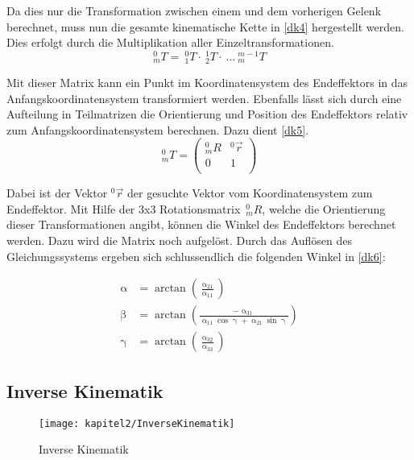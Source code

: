 Da dies nur die Transformation zwischen einem und dem vorherigen Gelenk berechnet, muss nun die gesamte kinematische Kette in \autoref{dk4} hergestellt werden. Dies erfolgt durch die Multiplikation aller Einzeltransformationen.
\begin{equation}
  ^{0}_{m}T =\: ^{0}_{1}T \cdot \: ^{1}_{2}T \cdot \: ...\: ^{m-1}_{m}T
\label{dk4}
\end{equation}

Mit dieser Matrix kann ein Punkt im Koordinatensystem des Endeffektors in das Anfangskoordinatensystem transformiert werden. Ebenfalls lässt sich durch eine Aufteilung in Teilmatrizen die Orientierung und Position des Endeffektors relativ zum Anfangskoordinatensystem berechnen. Dazu dient \autoref{dk5}.
\begin{equation}
  _{m}^{0}T = \begin{pmatrix}
    _{m}^{0}R & ^{0}\vec{r}\\
    0 & 1\\
  \end{pmatrix}
\label{dk5}
\end{equation}

Dabei ist der Vektor $^{0}\vec{r}$ der gesuchte Vektor vom Koordinatensystem zum Endeffektor. Mit Hilfe der 3x3 Rotationsmatrix $\,_{m}^{0}R$, welche die Orientierung dieser Transformationen angibt, können die Winkel des Endeffektors berechnet werden. Dazu wird die Matrix noch aufgelöst. Durch das Auflösen des Gleichungssystems ergeben sich schlussendlich die folgenden Winkel in \autoref{dk6}:

\begin{equation}
  \begin{aligned}
    \upalpha & = \arctan{\left(\frac{\upalpha_{21}}{\upalpha_{11}}\right)} \\[1em]
    \upbeta & = \arctan{\left(\frac{-\upalpha_{31}}{\upalpha_{11} \cos{\upgamma} + \upalpha_{21} \sin{\upgamma}}\right)} \\[1em]
    \upgamma & = \arctan{\left(\frac{\upalpha_{32}}{\upalpha_{33}}\right)}
  \end{aligned}
  \label{dk6}
\end{equation}

\subsection{Inverse Kinematik}

\begin{figure}[b!]
  \centering
  \texttt{[image: kapitel2/InverseKinematik]}
  \caption{Inverse Kinematik}
  \label{Kap2:inversekinematik}
\end{figure}

